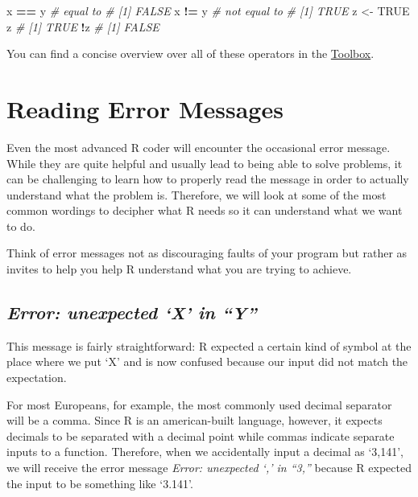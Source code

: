 \documentclass[
]{book}
\newenvironment{Shaded}{\begin{snugshade}}{\end{snugshade}}
\newcommand{\CommentTok}[1]{\textcolor[rgb]{0.56,0.35,0.01}{\textit{#1}}}
\newcommand{\ConstantTok}[1]{\textcolor[rgb]{0.56,0.35,0.01}{#1}}
\newcommand{\NormalTok}[1]{#1}
\newcommand{\OtherTok}[1]{\textcolor[rgb]{0.56,0.35,0.01}{#1}}
\newcommand{\SpecialCharTok}[1]{\textcolor[rgb]{0.81,0.36,0.00}{\textbf{#1}}}
\begin{document}
\begin{Shaded}
\begin{Highlighting}[]
\NormalTok{x }\SpecialCharTok{==}\NormalTok{ y }\CommentTok{\# equal to}
\CommentTok{\# [1] FALSE}
\NormalTok{x }\SpecialCharTok{!=}\NormalTok{ y }\CommentTok{\# not equal to}
\CommentTok{\# [1] TRUE}
\NormalTok{z }\OtherTok{\textless{}{-}} \ConstantTok{TRUE}
\NormalTok{z}
\CommentTok{\# [1] TRUE}
\SpecialCharTok{!}\NormalTok{z}
\CommentTok{\# [1] FALSE}
\end{Highlighting}
\end{Shaded}

You can find a concise overview over all of these operators in the \hyperref[toolbox]{Toolbox}.

\section{Reading Error Messages}\label{reading-error-messages}

Even the most advanced R coder will encounter the occasional error message.
While they are quite helpful and usually lead to being able to solve problems, it can be challenging to learn how to properly read the message in order to actually understand what the problem is.
Therefore, we will look at some of the most common wordings to decipher what R needs so it can understand what we want to do.

Think of error messages not as discouraging faults of your program but rather as invites to help you help R understand what you are trying to achieve.

\subsection*{\texorpdfstring{\emph{Error: unexpected `X' in ``Y''}}{Error: unexpected `X' in ``Y''}}\label{error-unexpected-x-in-y}

This message is fairly straightforward:
R expected a certain kind of symbol at the place where we put `X' and is now confused because our input did not match the expectation.

For most Europeans, for example, the most commonly used decimal separator will be a comma.
Since R is an american-built language, however, it expects decimals to be separated with a decimal point while commas indicate separate inputs to a function.
Therefore, when we accidentally input a decimal as `3,141', we will receive the error message \emph{Error: unexpected `,' in ``3,''} because R expected the input to be something like `3.141'.
\end{document}
